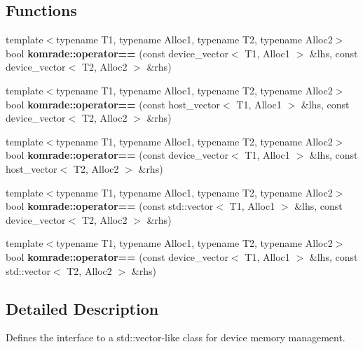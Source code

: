 \subsection*{Functions}
\begin{CompactItemize}
\item 
{\footnotesize template$<$typename T1, typename Alloc1, typename T2, typename Alloc2$>$ }\\bool {\bf komrade::operator==} (const device\_\-vector$<$ T1, Alloc1 $>$ \&lhs, const device\_\-vector$<$ T2, Alloc2 $>$ \&rhs)
\item 
{\footnotesize template$<$typename T1, typename Alloc1, typename T2, typename Alloc2$>$ }\\bool {\bf komrade::operator==} (const host\_\-vector$<$ T1, Alloc1 $>$ \&lhs, const device\_\-vector$<$ T2, Alloc2 $>$ \&rhs)
\item 
{\footnotesize template$<$typename T1, typename Alloc1, typename T2, typename Alloc2$>$ }\\bool {\bf komrade::operator==} (const device\_\-vector$<$ T1, Alloc1 $>$ \&lhs, const host\_\-vector$<$ T2, Alloc2 $>$ \&rhs)
\item 
{\footnotesize template$<$typename T1, typename Alloc1, typename T2, typename Alloc2$>$ }\\bool {\bf komrade::operator==} (const std::vector$<$ T1, Alloc1 $>$ \&lhs, const device\_\-vector$<$ T2, Alloc2 $>$ \&rhs)
\item 
{\footnotesize template$<$typename T1, typename Alloc1, typename T2, typename Alloc2$>$ }\\bool {\bf komrade::operator==} (const device\_\-vector$<$ T1, Alloc1 $>$ \&lhs, const std::vector$<$ T2, Alloc2 $>$ \&rhs)
\end{CompactItemize}


\subsection{Detailed Description}
Defines the interface to a std::vector-like class for device memory management. 

